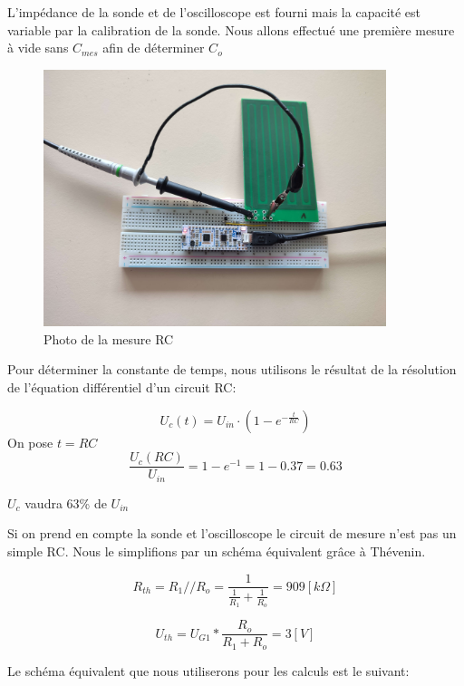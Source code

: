 L'impédance de la sonde et de l'oscilloscope est fourni mais la capacité est variable par la calibration de la sonde. Nous allons effectué une première mesure à vide sans $C_{mes}$ afin de déterminer $C_o$


\begin{figure}[!ht]
\centering
 \includegraphics[width=10cm]{RCPhoto.jpg}
 \caption{Photo de la mesure RC}
\end{figure}

\newpage

Pour déterminer la constante de temps, nous utilisons le résultat de la résolution de l'équation différentiel d'un circuit RC: 

\begin{equation}
 U_{c}(t) = U_{in} \cdot (1 - e^{-\frac{t}{RC}})
\end{equation}
On pose $t = RC$
\begin{equation}
\frac{U_c(RC)}{U_{in}} = 1 - e^{-1} = 1 - 0.37 = 0.63
\end{equation}

 $U_c$ vaudra 63\% de $U_{in}$ 

 
Si on prend en compte la sonde et l'oscilloscope le circuit de mesure n'est pas un simple RC. Nous le simplifions par un schéma équivalent grâce à Thévenin. 
 
\begin{equation}
 R_{th} = R_1 // R_o = \frac{1}{\frac{1}{R_1} + \frac{1}{R_o}} = 909 [k\Omega]
\end{equation}

\begin{equation}
 U_{th} = U_{G1} * \frac{R_o}{R_1 + R_o} = 3 [V]
\end{equation}

Le schéma équivalent que nous utiliserons pour les calculs est le suivant:

